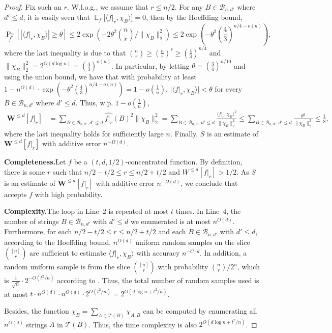 \documentclass{toc}
\DeclareMathOperator*{\E}{\mathbb{E}}
\newcommand{\Braket}[1]{\langle#1\rangle}
\newcommand{\W}{\mathbf{W}}
\begin{document}
\begin{proof}
Fix such an $r$. W.l.o.g., we assume that $r\leq n/2$. For any $B\in\mathcal{B}_{n,d'}$ where $d'\leq d$, it is easily seen that $\E_f\big[\Braket{f|_r, \chi_B}\big]=0$, then by the Hoeffding bound,
%
\begin{equation} %
    \Pr_f\left[\left|\Braket{f|_r, \chi_B}\right|\ge \theta\right]\leq 2 \exp\left(-2\theta^2 
    \binom{n}{r} %
    \big/ \|\chi_B\|^2_2\right)\leq 2\exp\left(-\theta^2 \left(\frac{4}{3}\right)^{n/4-o(n)}\right),
%
\end{equation} %
where the last inequality is due to that %
$\binom{n}{r} %
\geq (\frac{n}{r})^r \geq (\frac{4}{3})^{n/4}$ and $\|\chi_B\|^2_2=2^{O(d\log n)}=(\frac{4}{3})^{o(n)}$.
In particular, by letting $\theta=\left(\frac{3}{4}\right)^{n/10}$ and using the union bound, we have that with probability at least $1-n^{O(d)}\cdot \exp\left(-\theta^2 \left(\frac{4}{3}\right)^{n/4-o(n)}\right)=1-o(\frac{1}{n})$, $\big|\Braket{f|_r, \chi_B}\big|< \theta$ for every $B\in\mathcal{B}_{n,d'}$ where $d'\leq d$. Thus, w.p. $1-o(\frac{1}{n})$,
%
\begin{align} %
    \W^{\leq d}[f|_r]&=\sum_{B\in\mathcal{B}_{n,d'},d'\leq d} \widehat{f|_r}(B)^2\|\chi_B\|_2^2=\sum_{B\in\mathcal{B}_{n,d'},d'\leq d} \frac{\Braket{f|_r, \chi_B}^2}{\|\chi_B\|_2^2}
 \leq \sum_{B\in\mathcal{B}_{n,d'},d'\leq d} \frac{\theta^2}{\|\chi_B\|_2^2}\leq \frac{1}{8},
%
\end{align} %
where the last inequality holds for sufficiently large $n$. Finally, $S$ is an estimate of $\W^{\leq d}[f|_r]$ with additive error $n^{-\Omega(d)}$.

\vspace{2ex}
\noindent\textbf{Completeness.}\quad Let $f$ be a $(t,d,1/2)$-concentrated function. By definition, there is some $r$ such that $n/2-t/2\leq r\leq n/2+t/2$ and $W^{\leq d}[f|_r]>1/2$. As $S$ is an estimate of $\W^{\leq d}[f|_r]$ with additive error $n^{-\Omega(d)}$, we conclude that  accepts $f$ with high probability.

\vspace{2ex}
\noindent\textbf{Complexity.}\quad The loop in Line~2 is repeated at most $t$ times. In Line~4, the number of strings 
%
$B\in \mathcal{B}_{n,d'}$ with $d'\leq d$ %
we enumerated is at most $n^{O(d)}$.
Furthermore, for each $n/2-t/2\leq r\leq n/2+t/2$ and each 
%
$B\in\mathcal{B}_{n,d'}$ with $d'\leq d$, 
according to the Hoeffding bound, $n^{O(d)}$ uniform random samples on the slice 
%
$\binom{[n]}{r}$ %
are sufficient to estimate $\Braket{f|_r, \chi_B}$ with accuracy $n^{-C\cdot d}$. In addition, a random uniform sample is from the slice 
%
$\binom{[n]}{r}$ %
with probability 
%
$\binom{n}{r}/2^n$, %
which is $\frac{1}{\sqrt{n}}\cdot2^{-O(t^2/n)}$ according to . Thus, the total number of random samples used is at most $t \cdot n^{O(d)}\cdot n^{O(d)}\cdot 2^{O(t^2/n)}=2^{O(d\log n+t^2/n)}$.

Besides, the function 
%
$\chi_B=\sum_{A\in \mathcal{T}(B)}\chi_{A,B}$ %
can be computed by enumerating all $n^{O(d)}$ strings $A$ in 
%
$\mathcal{T}(B)$. %
Thus, the time complexity is also $2^{O(d\log n + t^2/n)}$.
\end{proof}
\end{document}
